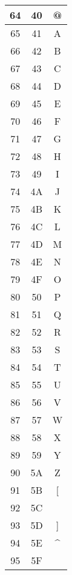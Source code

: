 {\begin{table}[H]
\begin{minipage}[t]{.32\textwidth}
\begin{tabular}{ccc}
        64  & 40 & @                   \\ \hline
        65  & 41 & A                   \\ \hline
        66  & 42 & B                   \\ \hline
        67  & 43 & C                   \\ \hline
        68  & 44 & D                   \\ \hline
        69  & 45 & E                   \\ \hline
        70  & 46 & F                   \\ \hline
        71  & 47 & G                   \\ \hline
        72  & 48 & H                   \\ \hline
        73  & 49 & I                   \\ \hline
        74  & 4A & J                   \\ \hline
        75  & 4B & K                   \\ \hline
        76  & 4C & L                   \\ \hline
        77  & 4D & M                   \\ \hline
        78  & 4E & N                   \\ \hline
        79  & 4F & O                   \\ \hline
        80  & 50 & P                   \\ \hline
        81  & 51 & Q                   \\ \hline
        82  & 52 & R                   \\ \hline
        83  & 53 & S                   \\ \hline
        84  & 54 & T                   \\ \hline
        85  & 55 & U                   \\ \hline
        86  & 56 & V                   \\ \hline
        87  & 57 & W                   \\ \hline
        88  & 58 & X                   \\ \hline
        89  & 59 & Y                   \\ \hline
        90  & 5A & Z                   \\ \hline
        91  & 5B & [                   \\ \hline
        92  & 5C & \                   \\ \hline
        93  & 5D & ]                   \\ \hline
        94  & 5E & \textasciicircum{}  \\ \hline
        95  & 5F & \underline{ }       \\ \hline
        

\end{tabular}
\end{minipage}
\end{table}}
